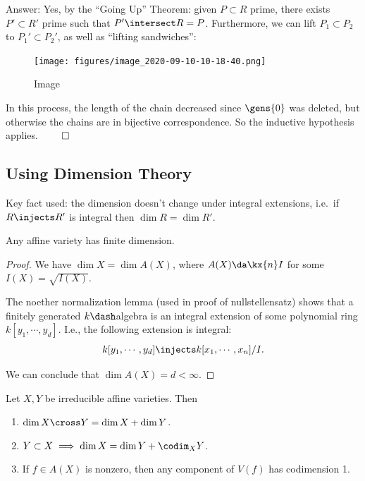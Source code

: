 Answer: Yes, by the ``Going Up'' Theorem: given \(P\subset R\) prime,
there exists \(P'\subset R'\) prime such that \(P'\intersect R = P\).
Furthermore, we can lift \(P_1 \subset P_2\) to \(P_1' \subset P_2'\),
as well as ``lifting sandwiches'':

\begin{figure}
\centering
\texttt{[image: figures/image\_2020-09-10-10-18-40.png]}
\caption{Image}
\end{figure}

In this process, the length of the chain decreased since \(\gens{0}\)
was deleted, but otherwise the chains are in bijective correspondence.
So the inductive hypothesis applies. \(\qed\)

\hypertarget{using-dimension-theory}{%
\subsection{Using Dimension Theory}\label{using-dimension-theory}}

Key fact used: the dimension doesn't change under integral extensions,
i.e.~if \(R\injects R'\) is integral then \(\dim R = \dim R'\).

\begin{proposition}

Any affine variety has finite dimension.

\end{proposition}

\begin{proof}

We have \(\dim X = \dim A(X)\), where \(A(X) \da \kx{n} I\) for some
\(I(X)=\sqrt{I(X)}\).

The noether normalization lemma (used in proof of nullstellensatz) shows
that a finitely generated \(k\dash\)algebra is an integral extension of
some polynomial ring \(k[y_1, \cdots, y_d]\). I.e., the following
extension is integral:
\begin{align*}  
k[y_1, \cdots, y_d] \injects k[x_1, \cdots, x_n]/I
.\end{align*}

We can conclude that \(\dim A(X) = d < \infty\).

\end{proof}

\begin{proposition}[?]

Let \(X, Y\) be irreducible affine varieties. Then

\begin{enumerate}
\def\labelenumi{\alph{enumi}.}
\tightlist
\item
  \(\dim X\cross Y = \dim X + \dim Y\).
\item
  \(Y\subset X \implies \dim X = \dim Y + \codim_X Y\).
\item
  If \(f\in A(X)\) is nonzero, then any component of \(V(f)\) has
  codimension 1.
\end{enumerate}

\end{proposition}

